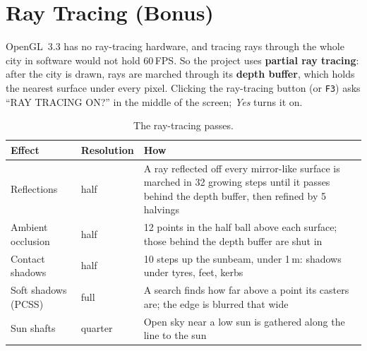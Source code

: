 \documentclass[11pt,a4paper]{article}
\newcommand{\code}[1]{\texttt{\small #1}}
\begin{document}
\section{Ray Tracing (Bonus)}

OpenGL~3.3 has no ray-tracing hardware, and tracing rays through the whole city in software would not hold 60\,FPS. So the project uses \textbf{partial ray tracing}: after the city is drawn, rays are marched through its \textbf{depth buffer}, which holds the nearest surface under every pixel. Clicking the ray-tracing button (or \code{F3}) asks ``RAY TRACING ON?'' in the middle of the screen; \emph{Yes} turns it on.

\begin{table}[H]
\centering\small
\begin{tabularx}{\textwidth}{@{}l l X@{}}
\toprule
Effect & Resolution & How \\ \midrule
Reflections & half & A ray reflected off every mirror-like surface is marched in 32 growing steps until it passes behind the depth buffer, then refined by 5 halvings \\
Ambient occlusion & half & 12 points in the half ball above each surface; those behind the depth buffer are shut in \\
Contact shadows & half & 10 steps up the sunbeam, under 1\,m: shadows under tyres, feet, kerbs \\
Soft shadows (PCSS) & full & A search finds how far above a point its casters are; the edge is blurred that wide \\
Sun shafts & quarter & Open sky near a low sun is gathered along the line to the sun \\
\bottomrule
\end{tabularx}
\caption{The ray-tracing passes.}
\end{table}
\end{document}
